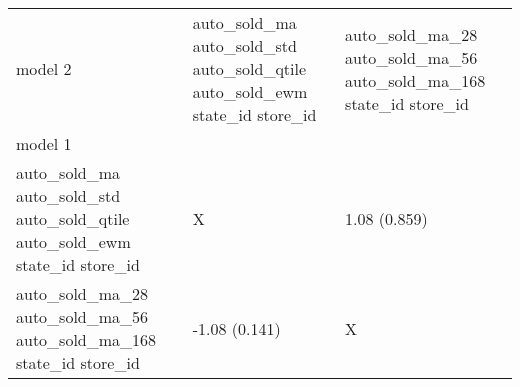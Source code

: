 \begin{tabular}{lll}
\toprule
model 2 & auto_sold_ma auto_sold_std auto_sold_qtile auto_sold_ewm state_id store_id & auto_sold_ma_28 auto_sold_ma_56 auto_sold_ma_168 state_id store_id \\
model 1 &  &  \\
\midrule
auto_sold_ma auto_sold_std auto_sold_qtile auto_sold_ewm state_id store_id & X & 1.08 (0.859) \\
auto_sold_ma_28 auto_sold_ma_56 auto_sold_ma_168 state_id store_id & -1.08 (0.141) & X \\
\bottomrule
\end{tabular}
